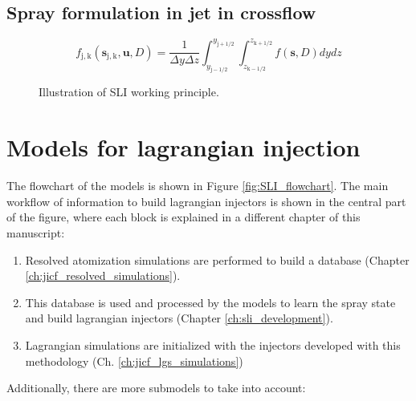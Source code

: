 \subsection{Spray formulation in jet in crossflow}



\begin{equation}
\label{eg:f_discrete_jicf}
f_\mathrm{j,k} \left( \boldsymbol{s}_\mathrm{j,k}, \boldsymbol{u}, D \right) = \frac{1}{\Delta y \Delta z} \int_{y_\mathrm{j-1/2}}^{y_\mathrm{j+1/2}} \int_{z_\mathrm{k-1/2}}^{z_\mathrm{k+1/2}}  f \left( \boldsymbol{s}, D \right) dy dz
\end{equation}

\begin{figure}[h!]	
	\centering
	\caption{Illustration of SLI working principle.}
	\label{fig:JICF_spray_formulation}
\end{figure}


\section{Models for lagrangian injection}
	\label{sec:ch4_models_flowchart}
	
The flowchart of the models is shown in Figure \ref{fig:SLI_flowchart}. The main workflow of information to build lagrangian injectors is shown in the central part of the figure, where each block is explained in a different chapter of this manuscript:


\begin{enumerate}

	\item Resolved atomization simulations are performed to build a database (Chapter \ref{ch:jicf_resolved_simulations}).
	
	\item This database is used and processed by the models to learn the spray state and build lagrangian injectors (Chapter \ref{ch:sli_development}).
	
	\item Lagrangian simulations are initialized with the injectors developed with this methodology (Ch. \ref{ch:jicf_lgs_simulations}) 


\end{enumerate}

Additionally, there are more submodels to take into account:

